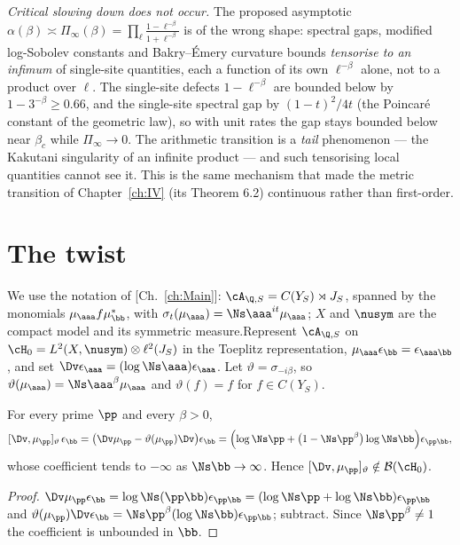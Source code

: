 \begin{summary}
\emph{Critical slowing down does not occur.} The proposed asymptotic
$\alpha(\beta)\asymp\Pi_\infty(\beta)=\prod_{\ell}\frac{1-\ell^{-\beta}}{1+\ell^{-\beta}}$
is of the wrong shape: spectral gaps, modified log-Sobolev constants and Bakry--\'Emery
curvature bounds \emph{tensorise to an infimum} of single-site quantities, each a function
of its own $\ell^{-\beta}$ alone, not to a product over $\ell$. The single-site defects
$1-\ell^{-\beta}$ are bounded below by $1-3^{-\beta}\ge0.66$, and the single-site spectral
gap by $(1-t)^2/4t$ (the Poincar\'e constant of the geometric law), so with unit rates the
gap stays bounded below near $\beta_c$ while $\Pi_\infty\to0$. The arithmetic transition is
a \emph{tail} phenomenon --- the Kakutani singularity of an infinite product --- and such
tensorising local quantities cannot see it. This is the same mechanism that made the metric
transition of Chapter~\ref{ch:IV} (its Theorem 6.2) continuous rather than first-order.
\end{summary}


\section{The twist}

We use the notation of [Ch.~\ref{ch:Main}]: $\cA_{\Q,S}=C(Y_S)\rtimes J_S$, spanned by the monomials
$\mu_\aaa f\mu_\bb^*$, with $\sigma_t(\mu_\aaa)=\Ns\aaa^{it}\mu_\aaa$; $X$ and $\nusym$ are
the compact model and its symmetric measure.Represent $\cA_{\Q,S}$ on $\cH_0=L^2(X,\nusym)\otimes\ell^2(J_S)$ in the Toeplitz
representation, $\mu_\aaa\epsilon_\bb=\epsilon_{\aaa\bb}$, and set
$\Dv\epsilon_\aaa=(\log\Ns\aaa)\epsilon_\aaa$. Let $\vartheta=\sigma_{-i\beta}$, so
$\vartheta(\mu_\aaa)=\Ns\aaa^{\beta}\mu_\aaa$ and $\vartheta(f)=f$ for $f\in C(Y_S)$.

\begin{proposition}\label{XVI:prop:unbounded}
For every prime $\pp$ and every $\beta>0$,
\begin{equation}\label{XVI:eq:twist}
[\Dv,\mu_\pp]_\vartheta\,\epsilon_\bb
=\bigl(\Dv\mu_\pp-\vartheta(\mu_\pp)\Dv\bigr)\epsilon_\bb
=\Bigl(\log\Ns\pp+\bigl(1-\Ns\pp^{\beta}\bigr)\log\Ns\bb\Bigr)\epsilon_{\pp\bb},
\end{equation}
whose coefficient tends to $-\infty$ as $\Ns\bb\to\infty$. Hence
$[\Dv,\mu_\pp]_\vartheta\notin\mathcal B(\cH_0)$.
\end{proposition}

\begin{proof}
$\Dv\mu_\pp\epsilon_\bb=\log\Ns(\pp\bb)\epsilon_{\pp\bb}=(\log\Ns\pp+\log\Ns\bb)\epsilon_{\pp\bb}$
and $\vartheta(\mu_\pp)\Dv\epsilon_\bb=\Ns\pp^{\beta}(\log\Ns\bb)\epsilon_{\pp\bb}$;
subtract. Since $\Ns\pp^\beta\ne1$ the coefficient is unbounded in $\bb$.
\end{proof}

